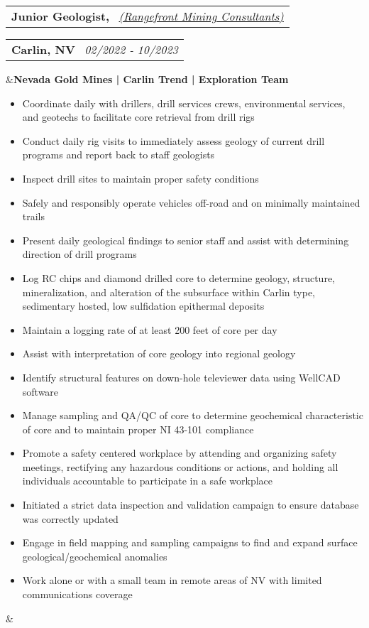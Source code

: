 \documentclass[11pt,a4paper,sans]{moderncv}
\makeatletter
\newcommand*{\customcventry}[7][.13em]{
\begin{tabular}{@{}l}
{\bfseries #4} \
{\itshape #3}
\end{tabular}
\hfill
\begin{tabular}{l@{}}
{\bfseries #5} \
{\itshape #2}
\end{tabular}
\ifx&#7&%
\else{\
\begin{minipage}{\maincolumnwidth}%
\small#7%
\end{minipage}}\fi%
\par\addvspace{#1}}
\makeatother
\begin{document}
\customcventry{02/2022 ‐ 10/2023}{{\color{blue}\href{https://www.rangefront.com/}{(Rangefront Mining Consultants)}}}{Junior Geologist,}{Carlin, NV}{}{\textbf{Nevada Gold Mines | Carlin Trend | Exploration Team}
\vspace{-1mm}
{\begin{itemize}[noitemsep, leftmargin=0.6cm, label={\textbullet}]
\item Coordinate daily with drillers, drill services crews, environmental services, and geotechs to facilitate core retrieval from drill rigs
\item Conduct daily rig visits to immediately assess geology of current drill programs and report back to staff geologists
\item Inspect drill sites to maintain proper safety conditions 
\item Safely and responsibly operate vehicles off-road and on minimally maintained trails 
\item Present daily geological findings to senior staff and assist with determining direction of drill programs 
\item Log RC chips and diamond drilled core to determine geology, structure, mineralization, and alteration of the subsurface within Carlin type, sedimentary hosted, low sulfidation epithermal deposits 
\item Maintain a logging rate of at least 200 feet of core per day
\item Assist with interpretation of core geology into regional geology 
\item Identify structural features on down-hole televiewer data using WellCAD software 
\item Manage sampling and QA/QC of core to determine geochemical characteristic of core and to maintain proper NI 43-101 compliance
\item Promote a safety centered workplace by attending and organizing safety meetings, rectifying any hazardous conditions or actions, and holding all individuals accountable to participate in a safe workplace
\item Initiated a strict data inspection and validation campaign to ensure database was correctly updated
\item Engage in field mapping and sampling campaigns to find and expand surface geological/geochemical anomalies
\item Work alone or with a small team in remote areas of NV with limited communications coverage
\end{itemize}}}
\end{document}
